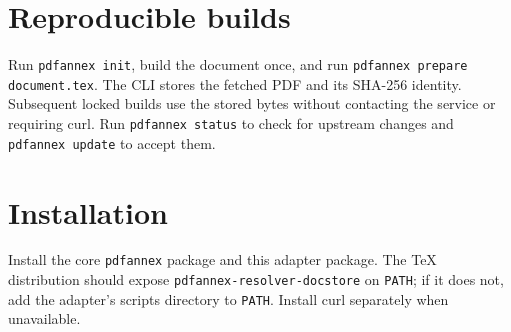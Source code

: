 \documentclass{article}
\begin{document}
\section{Reproducible builds}

Run \texttt{pdfannex init}, build the document once, and run
\texttt{pdfannex prepare document.tex}. The CLI stores the fetched PDF and its
SHA-256 identity. Subsequent locked builds use the stored bytes without
contacting the service or requiring curl. Run \texttt{pdfannex status} to check
for upstream changes and \texttt{pdfannex update} to accept them.

\section{Installation}

Install the core \texttt{pdfannex} package and this adapter package. The
TeX distribution should expose \texttt{pdfannex-resolver-docstore} on
\texttt{PATH}; if it does not, add the adapter's scripts directory to
\texttt{PATH}. Install curl separately when unavailable.
\end{document}
